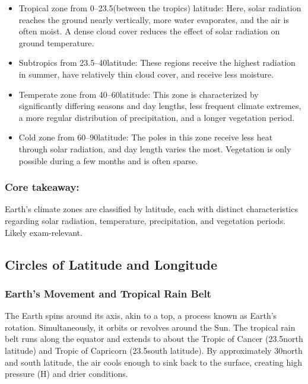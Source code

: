 \begin{itemize} 
    \item Tropical zone from 0\textdegree–23.5\textdegree (between the tropics) latitude: Here, solar radiation reaches the ground nearly vertically, more water evaporates, and the air is often moist. A dense cloud cover reduces the effect of solar radiation on ground temperature. 
    \item Subtropics from 23.5\textdegree–40\textdegree latitude: These regions receive the highest radiation in summer, have relatively thin cloud cover, and receive less moisture. 
    \item Temperate zone from 40\textdegree–60\textdegree latitude: This zone is characterized by significantly differing seasons and day lengths, less frequent climate extremes, a more regular distribution of precipitation, and a longer vegetation period. 
    \item Cold zone from 60\textdegree–90\textdegree latitude: The poles in this zone receive less heat through solar radiation, and day length varies the most. Vegetation is only possible during a few months and is often sparse. 
\end{itemize}

\subsubsection*{Core takeaway:} 
Earth's climate zones are classified by latitude, each with distinct characteristics regarding solar radiation, temperature, precipitation, and vegetation periods. Likely exam-relevant.


\subsection{Circles of Latitude and Longitude} 
\subsubsection{Earth's Movement and Tropical Rain Belt} 
The Earth spins around its axis, akin to a top, a process known as Earth's rotation. Simultaneously, it orbits or revolves around the Sun. The tropical rain belt runs along the equator and extends to about the Tropic of Cancer (23.5\textdegree north latitude) and Tropic of Capricorn (23.5\textdegree south latitude). By approximately 30\textdegree north and south latitude, the air cools enough to sink back to the surface, creating high pressure (H) and drier conditions.
